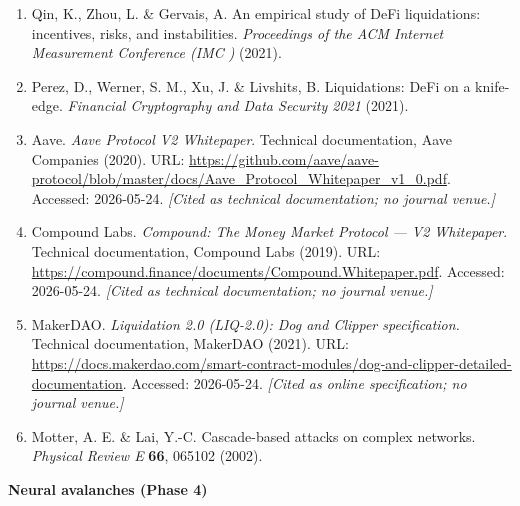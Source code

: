 \documentclass[
  11pt]{article}
\providecommand{\tightlist}{%
  \setlength{\itemsep}{0pt}\setlength{\parskip}{0pt}}
\begin{document}
\begin{enumerate}
\def\labelenumi{\arabic{enumi}.}
\setcounter{enumi}{27}
\tightlist
\item
  Qin, K., Zhou, L. \& Gervais, A. An empirical study of DeFi
  liquidations: incentives, risks, and instabilities. \emph{Proceedings
  of the ACM Internet Measurement Conference (IMC )}
  (2021).
\item
  Perez, D., Werner, S. M., Xu, J. \& Livshits, B. Liquidations: DeFi on
  a knife-edge. \emph{Financial Cryptography and Data Security 2021}
  (2021).
\item
  Aave. \emph{Aave Protocol V2 Whitepaper}. Technical documentation,
  Aave Companies (2020). URL:
  \url{https://github.com/aave/aave-protocol/blob/master/docs/Aave_Protocol_Whitepaper_v1_0.pdf}.
  Accessed: 2026-05-24. \emph{{[}Cited as technical documentation; no
  journal venue.{]}}
\item
  Compound Labs. \emph{Compound: The Money Market Protocol --- V2
  Whitepaper}. Technical documentation, Compound Labs (2019). URL:
  \url{https://compound.finance/documents/Compound.Whitepaper.pdf}.
  Accessed: 2026-05-24. \emph{{[}Cited as technical documentation; no
  journal venue.{]}}
\item
  MakerDAO. \emph{Liquidation 2.0 (LIQ-2.0): Dog and Clipper
  specification.} Technical documentation, MakerDAO (2021). URL:
  \url{https://docs.makerdao.com/smart-contract-modules/dog-and-clipper-detailed-documentation}.
  Accessed: 2026-05-24. \emph{{[}Cited as online specification; no
  journal venue.{]}}
\item
  Motter, A. E. \& Lai, Y.-C. Cascade-based attacks on complex networks.
  \emph{Physical Review E} \textbf{66}, 065102 (2002).
\end{enumerate}

\textbf{Neural avalanches (Phase 4)}
\end{document}
